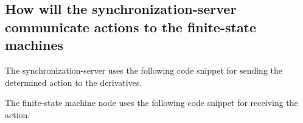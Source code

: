 \hypertarget{how-will-the-synchronization-server-communicate-actions-to-the-finite-state-machines}{%
\subsection{How will the synchronization-server communicate actions to
the finite-state
machines}\label{how-will-the-synchronization-server-communicate-actions-to-the-finite-state-machines}}

The synchronization-server uses the following code snippet for sending
the determined action to the derivatives.

\begin{Shaded}
\begin{Highlighting}[]
    \NormalTok{ derivatives[DERIVATIVES),}
\NormalTok{\{}
    \NormalTok{;}

\NormalTok{    \{}
\NormalTok{        \{}
\NormalTok{        \}}
\NormalTok{    \}}
\NormalTok{\}}

\NormalTok{\{}
\NormalTok{\}}
\end{Highlighting}
\end{Shaded}

The finite-state machine node uses the following code snippet for
receiving the action.

\begin{Shaded}
\begin{Highlighting}[]
\NormalTok{\{}

\NormalTok{\}}
\end{Highlighting}
\end{Shaded}

